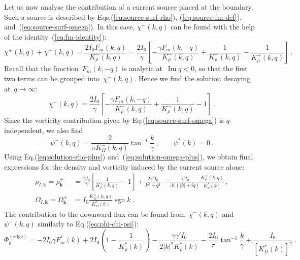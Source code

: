 \documentclass[preprint,aps,eqsecnum]{revtex4-1}
\newcommand{\fplus}[1]{{#1}^{+}}
\newcommand{\fminus}[1]{{#1}^{-}}
\renewcommand{\Im}{\mathop{\mathrm{Im}}\nolimits}
\newcommand{\sgn}{\mathop{\mathrm{sgn}}\nolimits}
\begin{document}
Let us now analyse the contribution of a current source placed at the boundary.
Such a source is described by Eqs.(\ref{eq:source-surf-rho}),
(\ref{eq:source-fm-def}),
and~(\ref{eq:source-surf-omega}). In this case, $\fminus{\chi}(k, q)$ can be
found with the help of the identity~(\ref{eq:fm-identity}):
\begin{equation}
\fplus{\chi}(k,q) + \fminus{\chi}(k, q) = \frac{2 I_0 F_m(k, q)}{\fminus{K}_\rho(k, q)}
= \frac{2I_0}{\gamma}
\left[ -  \frac{\gamma F_m(k, -q)}{\fminus{K}_\rho(k, q)}
+ \frac{1}{\fminus{K}_\rho(k, q)}  -  \frac{1}{\fplus{K}_\rho(k, q)}\right]
\  .
\end{equation}
Recall that the function~$F_m(k, -q)$ is analytic at~$\Im q < 0$,
so that the first two terms can be grouped into~$\fminus{\chi}(k, q)$.
Hence we find the solution decaying at~$q\to \infty$:
\begin{equation}
\fminus{\chi}(k, q) = \frac{2I_0}{\gamma}
\left[ - \frac{\gamma F_m(k, -q)}{\fminus{K}_\rho(k, q)}
       + \frac{1}{\fminus{K}_\rho(k, q)} - 1
\right]
\ .
\end{equation}
Since the vorticity contribution given by Eq.(\ref{eq:source-surf-omega})
is $q$-independent, we also find
\begin{equation}
  \fminus{\psi}(k, q) = \frac{2}{\pi \fminus{K}_\Omega(k, q)}
  \tan^{-1}\frac{k}{\gamma}
  \ , \qquad \psi^\ast(k) = 0
\ .
\end{equation}
Using Eq.(\ref{eq:solution-rho-plus}) and~(\ref{eq:solution-omega-plus}),
we obtain final expressions for
the density and vorticity induced by the current source alone:
\begin{align}
  \label{eq:rho-I}
\rho_{I, {\bm k}} = \fplus{\rho}_{\bm k}
&= \frac{2 I_0}{\gamma}\left[\frac{1}{\fplus{K}_\rho(k, q)} - 1\right]
+ \frac{2 \gamma' I_0}{k^2 + q^2}
  - \frac{\gamma' I_0}{|k|(|k| + iq)} \frac{\fplus{K}_\rho(k, q)}{K_\rho^\ast(k)}
  \ ,
  \\
  \label{eq:omega-I}
\Omega_{I, {\bm k}} = \fplus{\Omega}_{\bm k}
&= I_0 \frac{\fplus{K}_\Omega(k, q)}{K_\Omega^\ast(k)}  \sgn{k} \ .
\end{align}
The contribution to the downward flux can be found from~$\fminus{\chi}(k, q)$
and~$\fminus{\psi}(k, q)$ similarly to Eq.(\ref{eq:phi-chi-psi}):
\begin{equation}
  \Phi^\mathrm{(edge)}_{k} =  - 2 I_0 \gamma F_m^\ast(k)
  + 2 I_0 \left(1 - \frac{1}{K_\rho^\ast(k)}\right)
  - \frac{\gamma \gamma' I_0}{2|k|^2 K_\rho^\ast(k)}
  - \frac{2 I_0}{\pi} \tan^{-1}\frac{k}{\gamma}
  + \frac{I_0}{\left[K_\Omega^\ast(k)\right]^2}
\ .
\end{equation}
\end{document}
